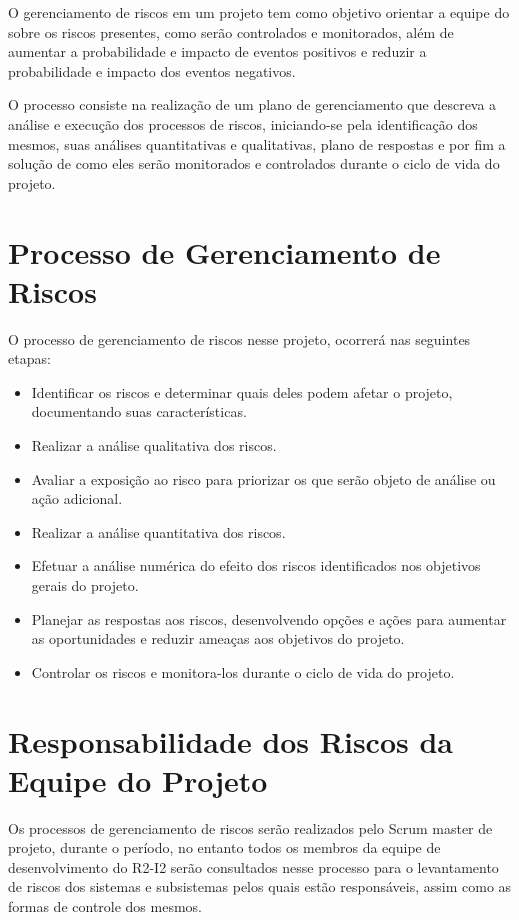 O gerenciamento de riscos em um projeto tem como objetivo orientar a equipe do sobre os riscos presentes, como serão controlados e monitorados, além de aumentar a probabilidade e  impacto de eventos positivos e reduzir a probabilidade e impacto dos eventos negativos.

O processo consiste na realização de um plano de gerenciamento que descreva a análise e execução dos processos de riscos, iniciando-se pela identificação dos mesmos, suas análises quantitativas e qualitativas, plano de respostas e por fim a solução de como eles serão monitorados e controlados durante o ciclo de vida do projeto.

\section{Processo de Gerenciamento de Riscos} %
\label{sec:processo_de_gerenciamento_de_riscos}
	
	O processo de gerenciamento de riscos nesse projeto, ocorrerá nas seguintes etapas:
	\begin{itemize}
		\item Identificar os riscos e determinar quais deles podem afetar o projeto, documentando suas características.
		\item Realizar a análise qualitativa dos riscos.
		\item Avaliar a exposição ao risco para priorizar os que serão objeto de análise ou ação adicional. 
		\item Realizar a análise quantitativa dos riscos.
		\item Efetuar a análise numérica do efeito dos riscos identificados nos objetivos gerais do projeto.
		\item Planejar as respostas aos riscos, desenvolvendo opções e ações para aumentar as oportunidades e reduzir ameaças aos objetivos do projeto.
		\item Controlar os riscos e monitora-los durante o ciclo de vida do projeto.

	\end{itemize}

\section{Responsabilidade dos Riscos da Equipe do Projeto} %
\label{sec:responsabilidade_dos_riscos_da_equipe_do_projeto}

Os processos de gerenciamento de riscos serão realizados pelo Scrum master de projeto, durante o período, no entanto todos os membros da equipe de desenvolvimento do R2-I2 serão consultados nesse processo para o levantamento de riscos dos sistemas e subsistemas pelos quais estão responsáveis, assim como as formas de controle dos mesmos.

